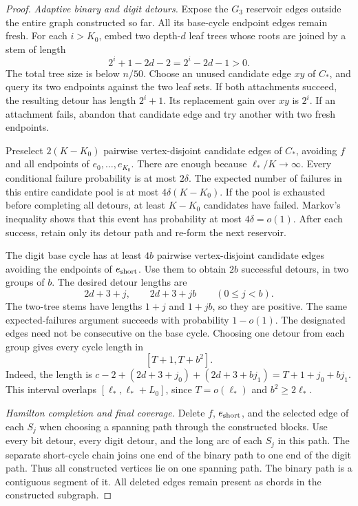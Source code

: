 \begin{proof}
\emph{Adaptive binary and digit detours.}
Expose the $G_3$ reservoir edges outside the entire graph constructed so far.
All its base-cycle endpoint edges remain fresh.
For each $i>K_0$, embed two depth-$d$ leaf trees whose roots are joined by a stem of length
\[
 2^i+1-2d-2=2^i-2d-1>0.
\]
The total tree size is below $n/50$.
Choose an unused candidate edge $xy$ of $C_*$, and query its two endpoints against the two leaf sets.
If both attachments succeed, the resulting detour has length $2^i+1$.
Its replacement gain over $xy$ is $2^i$.
If an attachment fails, abandon that candidate edge and try another with two fresh endpoints.

Preselect $2(K-K_0)$ pairwise vertex-disjoint candidate edges of $C_*$,
avoiding $f$ and all endpoints of $e_0,\ldots,e_{K_0}$.
There are enough because $\ell_*/K\to\infty$.
Every conditional failure probability is at most $2\delta$.
The expected number of failures in this entire candidate pool is at most $4\delta(K-K_0)$.
If the pool is exhausted before completing all detours, at least $K-K_0$ candidates have failed.
Markov's inequality shows that this event has probability at most $4\delta=o(1)$.
After each success, retain only its detour path and re-form the next reservoir.

The digit base cycle has at least $4b$ pairwise vertex-disjoint candidate edges avoiding the endpoints of $e_{\rm short}$.
Use them to obtain $2b$ successful detours, in two groups of $b$.
The desired detour lengths are
\[
 2d+3+j,\qquad 2d+3+jb\qquad(0\le j<b).
\]
The two-tree stems have lengths $1+j$ and $1+jb$, so they are positive.
The same expected-failures argument succeeds with probability $1-o(1)$.
The designated edges need not be consecutive on the base cycle.
Choosing one detour from each group gives every cycle length in
\[
 [T+1,T+b^2].
\]
Indeed, the length is $c-2+(2d+3+j_0)+(2d+3+bj_1)=T+1+j_0+bj_1$.
This interval overlaps $[\ell_*,\ell_*+L_0]$, since $T=o(\ell_*)$ and $b^2\ge2\ell_*$.

\emph{Hamilton completion and final coverage.}
Delete $f$, $e_{\rm short}$, and the selected edge of each $S_j$ when choosing a spanning path through the constructed blocks.
Use every bit detour, every digit detour, and the long arc of each $S_j$ in this path.
The separate short-cycle chain joins one end of the binary path to one end of the digit path.
Thus all constructed vertices lie on one spanning path.
The binary path is a contiguous segment of it.
All deleted edges remain present as chords in the constructed subgraph.


\end{proof}
